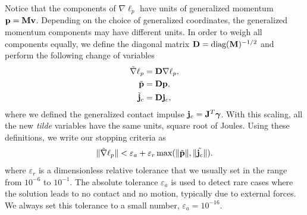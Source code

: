 Notice that the components of $\nabla\ell_p$ have units of generalized momentum
${\mathbf{p}}={\mathbf{M}}{\mathbf{v}}$. Depending on the choice of generalized coordinates, the
generalized momentum components may have different units. In order to weigh all
components equally, we define the diagonal matrix ${\mathbf{D}} =
\text{diag}({\mathbf{M}})^{-1/2}$ and perform the following change of variables
\begin{align}
	\tilde{\nabla}\ell_p &= \mf{D}\nabla\ell_p, \nonumber\\
	\tilde{\mf{p}} &= \mf{D}\mf{p}, \nonumber \\
	\tilde{\mf{j}}_c &= \mf{D}\mf{j}_c,
	\label{eq:scaled_momentum_quantities}
\end{align}
where we defined the generalized contact impulse ${\mathbf{j}}_c={\mathbf{J}}^T{\bm\gamma}$.
With this scaling, all the new \emph{tilde} variables have the same units,
square root of Joules. Using these definitions, we write our stopping criteria
as
\begin{equation}
	\Vert\tilde{\nabla}\ell_p\Vert < \varepsilon_a + \varepsilon_r\max(\Vert\tilde{\mf{p}}\Vert,\Vert\tilde{\mf{j}_c}\Vert).
	\label{eq:stopping_criteria}
\end{equation}
where $\varepsilon_r$ is a dimensionless relative tolerance that we usually set
in the range from $10^{-6}$ to $10^{-1}$. The absolute tolerance $\varepsilon_a$
is used to detect rare cases where the solution leads to no contact and no
motion, typically due to external forces. We always set this tolerance to a
small number, $\varepsilon_a=10^{-16}$.
